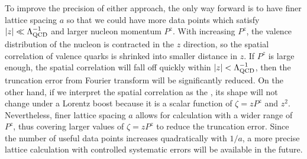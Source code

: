 To improve the precision of either approach, the only way forward is to have finer lattice spacing $a$ so that we could have more data points which satisfy $|z|\ll \Lambda_{\rm QCD}^{-1}$ and larger nucleon momentum $P^z$.
With increasing $P^z$, the valence distribution of the nucleon is contracted in the $z$ direction, so the spatial correlation of valence quarks is shrinked into smaller distance in $z$. If $P^z$ is large enough, the spatial correlation will fall off quickly within $|z|< \Lambda_{\rm QCD}^{-1}$, then the truncation error from Fourier transform will be significantly reduced. On the other hand, if we interpret the spatial correlation as the \spcorr, its shape will not change under a Lorentz boost because it is a scalar function of $\zeta=zP^z$ and $z^2$. Nevertheless, finer lattice spacing $a$ allows for calculation with a wider range of $P^z$, thus covering larger values of $\zeta=zP^z$ to reduce the truncation error. Since the number of useful data points increases quadratically with $1/a$, a more precise lattice calculation with controlled systematic errors will be available in the future.

